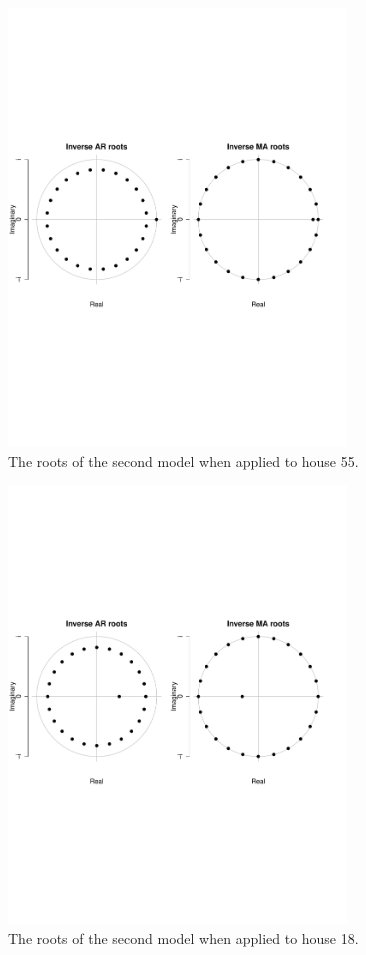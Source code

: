 \begin{figure}
    \centering
    \includegraphics[width=0.8\textwidth]{../../../figures/arimax/Roots_55.pdf}
    \caption{The roots of the second model when applied to house 55.}
    \label{fig:Model2_stationarity55}
\end{figure}    


\begin{figure}
    \centering
    \includegraphics[width=0.8\textwidth]{../../../figures/arimax/Roots_18.pdf}
    \caption{The roots of the second model when applied to house 18.}
    \label{fig:Model2_stationarity18}
\end{figure}    

